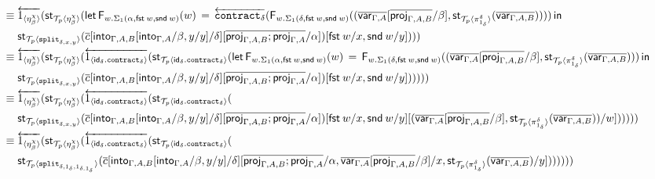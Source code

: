 \documentclass[10pt]{article}
\theoremstyle{definition}
\newcommand\dsd[1]{\ensuremath{\mathsf{#1}}}
\newcommand{\app}[2]{\ensuremath{#1 \: #2}}
\newcommand{\fst}[1]{\app{\dsd{fst}}{#1}}
\newcommand{\snd}[1]{\app{\dsd{snd}}{#1}}
\newcommand{\id}{\mathsf{id}}
\newcommand{\rewrite}[2]{\overleftarrow{#1}(#2)}
\newcommand\StI[2]{\ensuremath{\mathsf{st}_{#1}(#2)}}
\newcommand\FEs[4]{\ensuremath{\mathsf{let} \, \mathsf{F}_{#1}(#3) \, = \, {#2} \, \mathsf{in} \, #4}}
\newcommand\FIs[2]{\ensuremath{\mathsf{F}_{#1}{(#2)}}}
\newcommand\ApEl[2]{\mathcal{T}_{#1}\langle#2\rangle}
\newcommand\bdot[0]{\mathbin{.}}
\begin{document}
\begin{enumerate}[style = multiline, labelwidth = 80pt]
\begin{align*}
\equiv{} &\rewrite{1_{\langle \eta^\chi_\beta \rangle}}{\StI{\ApEl{p}{\eta^\chi_\beta}}{\FEs{w. \Sigma_1(\alpha,\fst w, \snd w)}{\rewrite{\contract{\delta}}{\FIs{w. \Sigma_1(\delta,\fst w, \snd w)}{(\upstairs{\var{\Gamma, A}}[\upstairs{\proj{\Gamma, A, B}}/\beta], \StI{\ApEl{p}{\pi^{\delta}_{1_{\delta}}}}{\upstairs{\var{\Gamma, A, B}}})}}}{w}{\\&\StI{\ApEl{p}{\tsplit{\delta,x,y}}}{\upstairs{c}[\into{\Gamma, A, B}[\into{\Gamma, A}/\beta, y/y] /\delta][\upstairs{\proj{\Gamma, A, B};\proj{\Gamma, A}}/\alpha]}[\fst w/x, \snd w/y]})}} \\
\equiv{} &\rewrite{1_{\langle \eta^\chi_\beta \rangle}}{\StI{\ApEl{p}{\eta^\chi_\beta}}{\rewrite{1_{\langle \id_\delta \bdot \contract{\delta} \rangle}}{\StI{\ApEl{p}{\id_\delta \bdot \contract{\delta}}}{\FEs{w. \Sigma_1(\alpha,\fst w, \snd w)}{\FIs{w. \Sigma_1(\delta,\fst w, \snd w)}{(\upstairs{\var{\Gamma, A}}[\upstairs{\proj{\Gamma, A, B}}/\beta], \StI{\ApEl{p}{\pi^{\delta}_{1_{\delta}}}}{\upstairs{\var{\Gamma, A, B}}})}}{w}{\\&\StI{\ApEl{p}{\tsplit{\delta,x,y}}}{\upstairs{c}[\into{\Gamma, A, B}[\into{\Gamma, A}/\beta, y/y] /\delta][\upstairs{\proj{\Gamma, A, B};\proj{\Gamma, A}}/\alpha]}[\fst w/x, \snd w/y]})}}}} \\
\equiv{} &\rewrite{1_{\langle \eta^\chi_\beta \rangle}}{\StI{\ApEl{p}{\eta^\chi_\beta}}{\rewrite{1_{\langle \id_\delta \bdot \contract{\delta} \rangle}}{\StI{\ApEl{p}{\id_\delta \bdot \contract{\delta}}}{\\&\StI{\ApEl{p}{\tsplit{\delta,x,y}}}{\upstairs{c}[\into{\Gamma, A, B}[\into{\Gamma, A}/\beta, y/y] /\delta][\upstairs{\proj{\Gamma, A, B};\proj{\Gamma, A}}/\alpha]}[\fst w/x, \snd w/y][(\upstairs{\var{\Gamma, A}}[\upstairs{\proj{\Gamma, A, B}}/\beta], \StI{\ApEl{p}{\pi^{\delta}_{1_{\delta}}}}{\upstairs{\var{\Gamma, A, B}}})/w]})}}} \\
\equiv{} &\rewrite{1_{\langle \eta^\chi_\beta \rangle}}{\StI{\ApEl{p}{\eta^\chi_\beta}}{\rewrite{1_{\langle \id_\delta \bdot \contract{\delta} \rangle}}{\StI{\ApEl{p}{\id_\delta \bdot \contract{\delta}}}{\\&\StI{\ApEl{p}{\tsplit{\delta,1_\delta,1_{\delta.1_\delta}}}}{\upstairs{c}[\into{\Gamma, A, B}[\into{\Gamma, A}/\beta, y/y] /\delta][\upstairs{\proj{\Gamma, A, B};\proj{\Gamma, A}}/\alpha, \upstairs{\var{\Gamma, A}}[\upstairs{\proj{\Gamma, A, B}}/\beta]/x, \StI{\ApEl{p}{\pi^{\delta}_{1_{\delta}}}}{\upstairs{\var{\Gamma, A, B}}}/y]}})}}} \\
\end{align*}

\end{enumerate}
\end{document}
